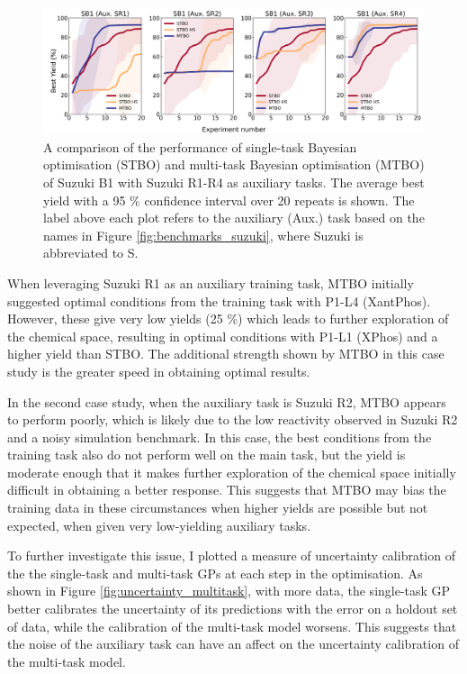 \begin{figure}
    \centering
    \includegraphics[width=1.2\textwidth]{gfx/Chapter04/baumgartner_suzuki_reizman_suzuki_one_cotraining_optimization.png}
    \caption{A comparison of the performance of single-task Bayesian optimisation (STBO) and multi-task Bayesian optimisation (MTBO) of Suzuki B1 with Suzuki R1-R4 as auxiliary tasks. The average best yield with a 95 \% confidence interval over 20 repeats is shown. The label above each plot refers to the auxiliary (Aux.) task based on the names in Figure \ref{fig:benchmarks_suzuki}, where Suzuki is abbreviated to S.}
    \label{fig:baumgartner_multitask}
\end{figure}

When leveraging Suzuki R1 as an auxiliary training task, MTBO initially suggested optimal conditions from the training task with P1-L4 (XantPhos). However, these give very low yields (25 \%) which leads to further exploration of the chemical space, resulting in optimal conditions with P1-L1 (XPhos) and a higher yield than STBO. The additional strength shown by MTBO in this case study is the greater speed in obtaining optimal results.

In the second case study, when the auxiliary task is Suzuki R2, MTBO appears to perform poorly, which is likely due to the low reactivity observed in Suzuki R2 and a noisy simulation benchmark. In this case, the best conditions from the training task also do not perform well on the main task, but the yield is moderate enough that it makes further exploration of the chemical space initially difficult in obtaining a better response. This suggests that MTBO may bias the training data in these circumstances when higher yields are possible but not expected, when given very low-yielding auxiliary tasks. 

To further investigate this issue, I plotted a measure of uncertainty calibration of the the single-task and multi-task GPs at each step in the optimisation. As shown in Figure  \ref{fig:uncertainty_multitask}, with more data, the single-task GP better calibrates the uncertainty of its predictions with the error on a holdout set of data, while the calibration of the multi-task model worsens. This suggests that the noise of the auxiliary task can have an affect on the uncertainty calibration of the multi-task model.

